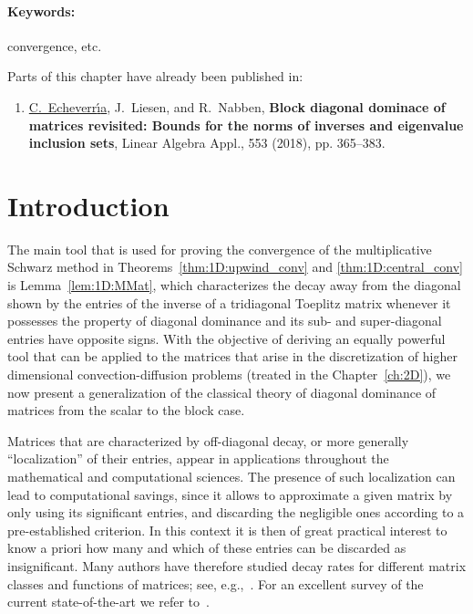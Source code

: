 \paragraph{Keywords:} convergence, etc.


\else

Parts of this chapter have already been published in:
\begin{enumerate}
\item[\cite{EchLieNab18}] \underline{C.~Echeverr{\'\i}a}, J.~Liesen, and R.~Nabben, \textbf{Block diagonal dominace of matrices revisited: Bounds for the norms of inverses and eigenvalue inclusion sets}, Linear Algebra Appl., 553 (2018), pp. 365--383.
\end{enumerate}
%
\vspace{0.25cm}
%
\section{Introduction}
\label{BDiDo:intro}
The main tool that is used for proving the convergence of the multiplicative Schwarz method in Theorems~\ref{thm:1D:upwind_conv} and \ref{thm:1D:central_conv} is Lemma~\ref{lem:1D:MMat}, which characterizes the decay away from the diagonal shown by the entries of the inverse of a tridiagonal Toeplitz matrix whenever it possesses the property of diagonal dominance and its sub- and super-diagonal entries have opposite signs. With the objective of deriving an equally powerful tool that can be applied to the matrices that arise in the discretization of higher dimensional convection-diffusion problems (treated in the Chapter~\ref{ch:2D}), we now present a generalization of the classical theory of diagonal dominance of matrices from the scalar to the block case.

Matrices that are characterized by off-diagonal decay, or more generally
``localization'' of their {entries}, appear in applications throughout the
mathematical and computational sciences. The presence of such localization can
lead to  computational savings, since it allows to approximate a
given matrix by only using its significant entries, and discarding the
negligible ones according to a pre-established criterion. In this context it is
then of great practical interest to know a priori how many and which of these
entries can be discarded as insignificant. Many authors have therefore studied
decay rates for different matrix classes and functions of matrices; see,
\linebreak
e.g.,~\cite{BenBoi14,BenGol99,BenRaz07,BenSim15,CanSimVer14,DemMosSmi84,KriStrWer15,PelPol01}. For an excellent survey of the current state-of-the-art we refer to~\cite{Ben16}.

